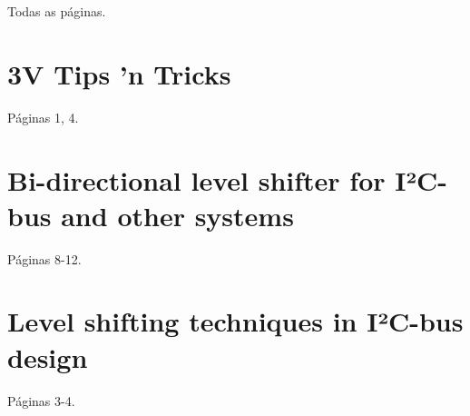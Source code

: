 \documentclass[brazil,pagestart=firstchapter]{abnt}
\begin{document}
Todas as páginas. \cite{HMC5883L}




\chapter{3V Tips 'n Tricks}
\label{anx:3vtipsandtricks_pdf}

Páginas 1, 4. \cite{3vtipsandtricks}




\chapter{Bi-directional level shifter for I²C-bus and other systems}
\label{anx:AN97055_pdf}

Páginas 8-12. \cite{AN97055}




\chapter{Level shifting techniques in I²C-bus design}
\label{anx:AN10441_pdf}

Páginas 3-4. \cite{AN10441}




%
%
%
\end{document}
